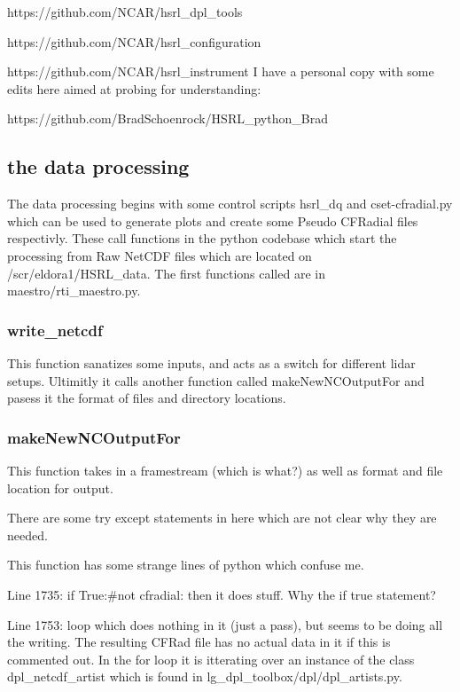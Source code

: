 \documentclass[a4paper,12pt]{article}
\begin{document}
https://github.com/NCAR/hsrl\_dpl\_tools

https://github.com/NCAR/hsrl\_configuration

https://github.com/NCAR/hsrl\_instrument
\newline
\newline
I have a personal copy with some edits here aimed at probing for understanding: 

https://github.com/BradSchoenrock/HSRL\_python\_Brad
\newline
\newline

\subsection{the data processing}
\label{SECTION-Data-Processing}

The data processing begins with some control scripts hsrl\_dq and cset-cfradial.py which can be used to generate plots and create some Pseudo CFRadial files respectivly. These call functions in the python codebase which start the processing from Raw NetCDF files which are located on /scr/eldora1/HSRL\_data. The first functions called are in maestro/rti\_maestro.py. 

\subsubsection{write\_netcdf}
\label{SECTION-writenetcdf}

This function sanatizes some inputs, and acts as a switch for different lidar setups. Ultimitly it calls another function called makeNewNCOutputFor and pasess it the format of files and directory locations. 

\subsubsection{makeNewNCOutputFor}
\label{SECTION-makeNewNCOutputFor}

This function takes in a framestream (which is what?) as well as format and file location for output. 

There are some try except statements in here which are not clear why they are needed. 

This function has some strange lines of python which confuse me. 

Line 1735: if True:\#not cfradial: then it does stuff. Why the if true statement? 

Line 1753: loop which does nothing in it (just a pass), but seems to be doing all the writing. The resulting CFRad file has no actual data in it if this is commented out. In the for loop it is itterating over an instance of the class dpl\_netcdf\_artist which is found in lg\_dpl\_toolbox/dpl/dpl\_artists.py. 
\end{document}
